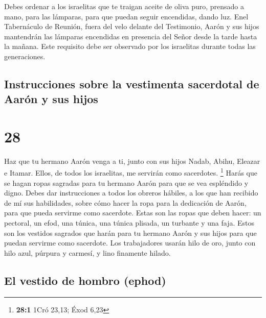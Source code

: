  Debes ordenar a los israelitas que te traigan aceite de
oliva puro, prensado a mano, para las lámparas, para que puedan seguir
encendidas, dando luz.  Enel Tabernáculo de Reunión,
fuera del velo delante del Testimonio, Aarón y sus hijos mantendrán las
lámparas encendidas en presencia del Señor desde la tarde hasta la
mañana. Este requisito debe ser observado por los israelitas durante
todas las generaciones.

\hypertarget{instrucciones-sobre-la-vestimenta-sacerdotal-de-aaruxf3n-y-sus-hijos}{%
\subsection{Instrucciones sobre la vestimenta sacerdotal de Aarón y sus
hijos}\label{instrucciones-sobre-la-vestimenta-sacerdotal-de-aaruxf3n-y-sus-hijos}}

\hypertarget{section-27}{%
\section{28}\label{section-27}}

 Haz que tu hermano Aarón venga a ti, junto con sus hijos
Nadab, Abihu, Eleazar e Itamar. Ellos, de todos los israelitas, me
servirán como sacerdotes. \footnote{\textbf{28:1} 1Cró 23,13; Éxod 6,23}
 Harás que se hagan ropas sagradas para tu hermano Aarón
para que se vea espléndido y digno.  Debes dar
instrucciones a todos los obreros hábiles, a los que han recibido de mí
sus habilidades, sobre cómo hacer la ropa para la dedicación de Aarón,
para que pueda servirme como sacerdote.  Estas son las
ropas que deben hacer: un pectoral, un efod, una túnica, una túnica
plisada, un turbante y una faja. Estos son los vestidos sagrados que
harán para tu hermano Aarón y sus hijos para que puedan servirme como
sacerdote.  Los trabajadores usarán hilo de oro, junto con
hilo azul, púrpura y carmesí, y lino finamente hilado.

\hypertarget{el-vestido-de-hombro-ephod}{%
\subsection{El vestido de hombro
(ephod)}\label{el-vestido-de-hombro-ephod}}

